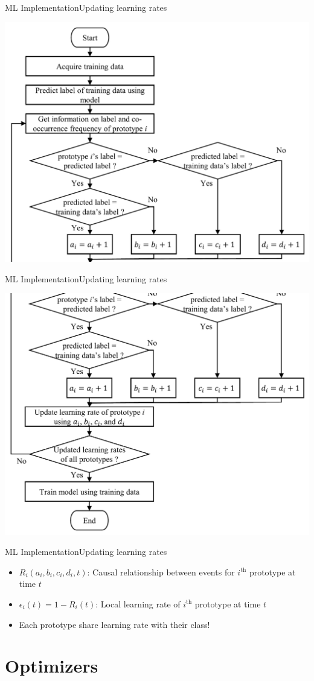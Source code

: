 \documentclass[
	aspectratio=169,	%
	onlytextwidth,		%
	t,					%
	]{beamer}
\begin{document}
	\begin{frame}[fragile]{ML Implementation}{Updating learning rates}
	
		\centering
				\includegraphics[width=.4\textwidth]{myfigs/lr flowchart1.png}
	\end{frame}

	\begin{frame}[fragile]{ML Implementation}{Updating learning rates}
	
		\centering
				\includegraphics[width=.4\textwidth]{myfigs/lr flowchart2.png}
	\end{frame}

	\begin{frame}{ML Implementation}{Updating learning rates}
		\vfill
		\begin{itemize}
			\item<1->$R_{i}(a_{i},b_{i},c_{i},d_{i},t)$: Causal relationship between events for $i^{\text{th}}$ prototype at time $t$
			\item<2->$\epsilon_{i}(t) = 1- R_{i}(t)$: Local learning rate of $i^{\text{th}}$ prototype at time $t$
			\item <3-> Each prototype share learning rate with their class!
		\end{itemize}
		\vfill

	\end{frame}


	\section{Optimizers}
	
\end{document}
